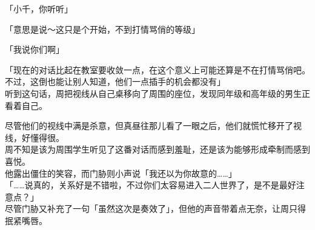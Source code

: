 「小千，你听听」

「意思是说～这只是个开始，不到打情骂俏的等级」

「我说你们啊」

「现在的对话比起在教室要收敛一点，在这个意义上可能还算是不在打情骂俏吧。不过，这倒也能让别人知道，他们一点插手的机会都没有」\\

听到这句话，周把视线从自己桌移向了周围的座位，发现同年级和高年级的男生正看着自己。

尽管他们的视线中满是杀意，但真昼往那儿看了一眼之后，他们就慌忙移开了视线，好懂得很。\\

周不知是该为周围学生听见了这番对话而感到羞耻，还是该为能够形成牵制而感到喜悦。\\

他露出僵住的笑容，而门胁则小声说「我还以为你故意的……」\\

「……说真的，关系好是不错啦，不过你们太容易进入二人世界了，是不是最好注意点？」\\

尽管门胁又补充了一句「虽然这次是奏效了」，但他的声音带着点无奈，让周只得抿紧嘴唇。
